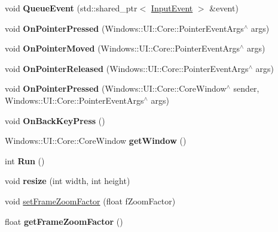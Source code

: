 \begin{DoxyCompactItemize}
void {\bfseries Queue\+Event} (std\+::shared\+\_\+ptr$<$ \hyperlink{classInputEvent}{Input\+Event} $>$ \&event)
\item 
\mbox{\label{classGLViewImpl_a3fcd4cc624abb75d010920e762ab9d42}} 
void {\bfseries On\+Pointer\+Pressed} (Windows\+::\+U\+I\+::\+Core\+::\+Pointer\+Event\+Args$^\wedge$ args)
\item 
\mbox{\label{classGLViewImpl_a9d19ce5d32488824616a092b30e84cc9}} 
void {\bfseries On\+Pointer\+Moved} (Windows\+::\+U\+I\+::\+Core\+::\+Pointer\+Event\+Args$^\wedge$ args)
\item 
\mbox{\label{classGLViewImpl_acd289c91947f5094a6a3e17c351c3ad6}} 
void {\bfseries On\+Pointer\+Released} (Windows\+::\+U\+I\+::\+Core\+::\+Pointer\+Event\+Args$^\wedge$ args)
\item 
\mbox{\label{classGLViewImpl_a0a5781a54e634c0f0d04e69e1b6662ed}} 
void {\bfseries On\+Pointer\+Pressed} (Windows\+::\+U\+I\+::\+Core\+::\+Core\+Window$^\wedge$ sender, Windows\+::\+U\+I\+::\+Core\+::\+Pointer\+Event\+Args$^\wedge$ args)
\item 
\mbox{\label{classGLViewImpl_adeb1b307fddf705b9b4f7a1cd64011e6}} 
void {\bfseries On\+Back\+Key\+Press} ()
\item 
\mbox{\label{classGLViewImpl_a32a556d3cbcf77db26936ae6d132df8c}} 
Windows\+::\+U\+I\+::\+Core\+::\+Core\+Window {\bfseries get\+Window} ()
\item 
\mbox{\label{classGLViewImpl_a11bbfff225021f936218bb789e55766c}} 
int {\bfseries Run} ()
\item 
\mbox{\label{classGLViewImpl_a9fd6d9d55d9567665caea22bd738d989}} 
void {\bfseries resize} (int width, int height)
\item 
void \hyperlink{classGLViewImpl_a1fbfd81198efe1e87f725b2dfa53bab8}{set\+Frame\+Zoom\+Factor} (float f\+Zoom\+Factor)
\item 
\mbox{\label{classGLViewImpl_a7c62d8d733881a5261f9c21565819e1b}} 
float {\bfseries get\+Frame\+Zoom\+Factor} ()
\item 

\end{DoxyCompactItemize}
